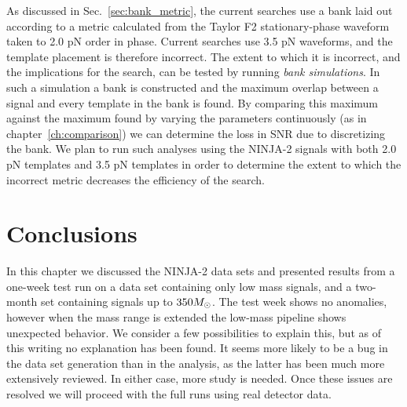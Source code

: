 As discussed in Sec.~\ref{sec:bank_metric}, the current searches
use a bank laid out according to a metric calculated from the Taylor
F2 stationary-phase waveform taken to 2.0 pN order in phase.  Current
searches use 3.5 pN waveforms, and the template placement is therefore
incorrect.  The extent to which it is incorrect, and the implications
for the search, can be tested by running \emph{bank simulations}.  In
such a simulation a bank is constructed and the maximum overlap
between a signal and every template in the bank is found.  By
comparing this maximum against the maximum found by varying the
parameters continuously (as in chapter~\ref{ch:comparison}) we can
determine the loss in SNR due to discretizing  the bank.  We plan to
run such analyses using the NINJA-2 signals with both 2.0 pN templates
and 3.5 pN templates in order to determine the extent to which the
incorrect metric decreases the efficiency of the search.

\section{Conclusions}

In this chapter we discussed the NINJA-2 data sets and presented
results from a one-week test run on a data set containing only low
mass signals, and a two-month set containing signals up to $350
M_\odot$.  The test week shows no anomalies, however when the mass range
is extended the low-mass pipeline shows unexpected behavior.  We
consider a few possibilities to explain this, but as of this writing
no explanation has been found.  It seems more likely to be a bug in
the data set generation than in the analysis, as the latter has been
much more extensively reviewed.  In either case, more study is needed.
Once these issues are resolved we will proceed with the full runs
using real detector data.


